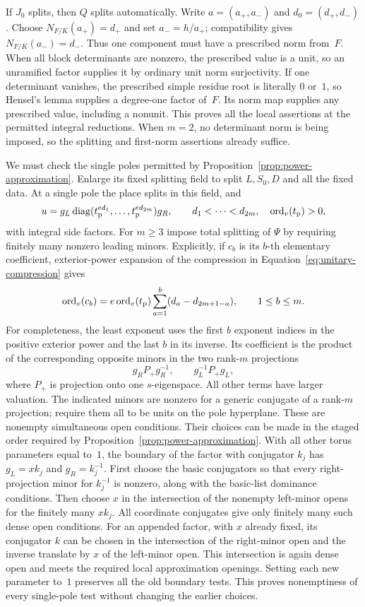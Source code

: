 If $J_0$ splits, then $Q$ splits automatically.  Write
$a=(a_+,a_-)$ and $d_0=(d_+,d_-)$.  Choose
$N_{F/K}(a_+)=d_+$ and set $a_-=h/a_+$; compatibility gives
$N_{F/K}(a_-)=d_-$.  Thus one component must have a prescribed norm
from~$F$.
When all block determinants are nonzero, the prescribed value is a
unit, so an unramified factor supplies it by ordinary unit norm
surjectivity.  If one determinant vanishes, the prescribed simple
residue root is literally $0$ or~$1$, so Hensel's lemma supplies a
degree-one factor of~$F$.  Its norm map supplies any prescribed value,
including a nonunit.  This proves all the local assertions at the
permitted integral reductions.  When $m=2$, no determinant norm is
being imposed, so the splitting and first-norm assertions already
suffice.

We must check the single poles permitted by
Proposition~\ref{prop:power-approximation}.  Enlarge its fixed
splitting field to split $L,S_0,D$ and all the fixed data.  At a
single pole the place splits in this field, and
\[
 u=g_L\operatorname{diag}(t_{\rm p}^{ed_1},\ldots,t_{\rm p}^{ed_{2m}})g_R,
 \qquad d_1<\cdots<d_{2m},\quad \operatorname{ord}_v(t_{\rm p})>0,
\]
with integral side factors.  For $m\geq3$ impose total splitting of
$\Psi$ by requiring finitely many nonzero leading minors.  Explicitly,
if $c_b$ is its $b$-th elementary coefficient, exterior-power
expansion of the compression in
Equation~\eqref{eq:unitary-compression} gives
\begin{equation}\label{eq:unitary-pole-valuations}
 \operatorname{ord}_v(c_b)=e\operatorname{ord}_v(t_{\rm p})
       \sum_{a=1}^b(d_a-d_{2m+1-a}),\qquad 1\leq b\leq m.
\end{equation}
For completeness, the least exponent uses the first $b$ exponent
indices in the positive exterior power and the last $b$ in its
inverse.  Its coefficient is the product of the corresponding
opposite minors in the two rank-$m$ projections
\[
 g_RP_+g_R^{-1},\qquad g_L^{-1}P_+g_L,
\]
where $P_+$ is projection onto one $s$-eigenspace.  All other terms
have larger valuation.  The indicated minors are nonzero for a
generic conjugate of a rank-$m$ projection; require them all to be
units on the pole hyperplane.  These are nonempty simultaneous open
conditions.  Their choices can be made in the staged order required
by Proposition~\ref{prop:power-approximation}.  With all other torus
parameters equal to~$1$, the boundary of the factor with conjugator
$k_j$ has $g_L=xk_j$ and $g_R=k_j^{-1}$.  First choose the basic
conjugators so that every right-projection minor for $k_j^{-1}$ is
nonzero, along with the basic-list dominance conditions.  Then choose
$x$ in the intersection of the nonempty left-minor opens for the
finitely many $xk_j$.  All coordinate conjugates give only finitely
many such dense open conditions.  For an appended factor, with $x$
already fixed, its conjugator $k$ can be chosen in the intersection
of the right-minor open and the inverse translate by $x$ of the
left-minor open.  This intersection is again dense open and meets
the required local approximation openings.  Setting each new
parameter to~$1$ preserves all the old boundary tests.  This proves
nonemptiness of every single-pole test without changing the earlier
choices.

